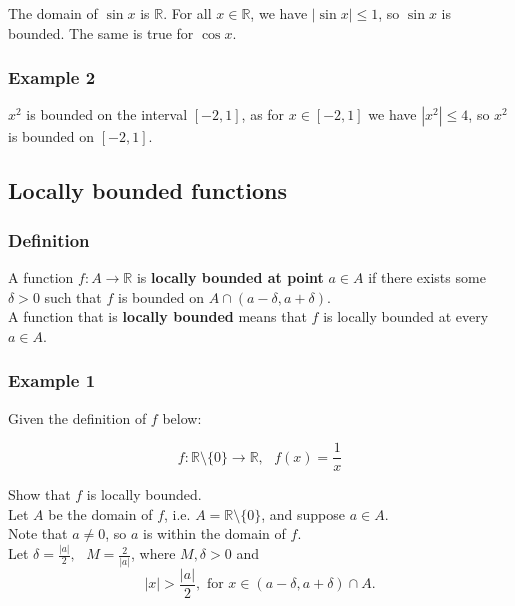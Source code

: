 \documentclass[11pt]{article}
\begin{document}
The domain of \(\sin x\) is \(\mathbb{R}\). For all \(x \in \mathbb{R}\), we have \(|\sin x| \le 1\), so \(\sin x\) is bounded. The same is true for \(\cos x\).


\subsubsection{Example 2}
\label{sec:org9c51198}
\(x^2\) is bounded on the interval \([-2, 1]\), as for \(x \in [-2, 1]\) we have \(|x^2| \le 4\), so \(x^2\) is bounded on \([-2, 1]\).


\subsection{Locally bounded functions}
\label{sec:orgb62dd3b}

\subsubsection{Definition}
\label{sec:orgd0ec1f0}
A function \(f : A \rightarrow \mathbb{R}\) is \textbf{locally bounded at point} \(a \in A\) if there exists some \(\delta > 0\) such that \(f\) is bounded on \(A \cap (a - \delta, a + \delta)\).
\\[0pt]

A function that is \textbf{locally bounded} means that \(f\) is locally bounded at every \(a \in A\).

\subsubsection{Example 1}
\label{sec:org46a2465}

Given the definition of \(f\) below:

\[f : \mathbb{R} \setminus \{0\} \rightarrow \mathbb{R}, \text{ } f(x) = \frac{1}{x}\]

Show that \(f\) is locally bounded.
\\[0pt]

Let \(A\) be the domain of \(f\), i.e. \(A = \mathbb{R} \setminus \{0\}\), and suppose \(a \in A\).
\\[0pt]

Note that \(a \neq 0\), so \(a\) is within the domain of \(f\).
\\[0pt]

Let \(\delta = \frac{|a|}{2}, \text{ } M = \frac{2}{|a|}\), where \(M, \delta > 0\) and
\[|x| > \frac{|a|}{2}, \text{ for } x \in (a - \delta, a + \delta) \cap A.\]
\end{document}
